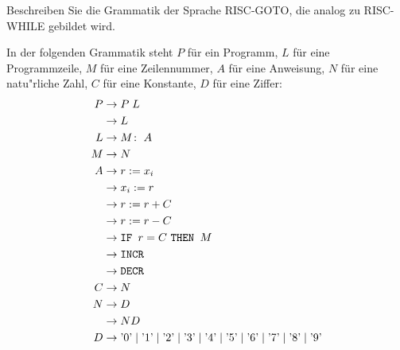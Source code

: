 Beschreiben Sie die Grammatik der Sprache RISC-GOTO, die analog zu
RISC-WHILE gebildet wird.

\begin{loesung}
In der folgenden Grammatik steht $P$ für ein Programm, $L$ für
eine Programmzeile, $M$ für eine Zeilennummer, $A$ für eine
Anweisung, $N$ für eine natu"rliche Zahl, $C$ für eine Konstante,
$D$ für eine Ziffer:
\begin{align*}
P&\rightarrow P\; L\\
 &\rightarrow L\\
L&\rightarrow M\colon \; A\\
M&\rightarrow N\\
A&\rightarrow r := x_i\\
 &\rightarrow x_i := r\\
 &\rightarrow r := r + C\\
 &\rightarrow r := r - C\\
 &\rightarrow \text{\tt IF } r = C \text{ \tt THEN } M\\
 &\rightarrow \texttt{INCR}\\
 &\rightarrow \texttt{DECR}\\
C&\rightarrow N\\
N&\rightarrow D\\
 &\rightarrow ND\\
D&\rightarrow
\text{'0'}\;|\;
\text{'1'}\;|\;
\text{'2'}\;|\;
\text{'3'}\;|\;
\text{'4'}\;|\;
\text{'5'}\;|\;
\text{'6'}\;|\;
\text{'7'}\;|\;
\text{'8'}\;|\;
\text{'9'}
\end{align*}
\end{loesung}
